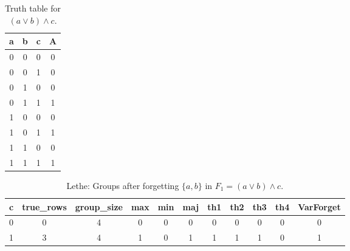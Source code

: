 \begin{table}[!tb]
    \centering
    \begin{tabular}{|c|c|c|c|}
        \hline
        \textbf{a} & \textbf{b} & \textbf{c} & \textbf{A} \\ \hline
        0 & 0 & 0 & 0 \\ \hline
        0 & 0 & 1 & 0 \\ \hline
        0 & 1 & 0 & 0 \\ \hline
        0 & 1 & 1 & 1 \\ \hline
        1 & 0 & 0 & 0 \\ \hline
        1 & 0 & 1 & 1 \\ \hline
        1 & 1 & 0 & 0 \\ \hline
        1 & 1 & 1 & 1 \\ \hline
    \end{tabular}
    \caption{Truth table for $(a \lor b) \land c$.}
    \label{tab:truthtab}
\end{table}

\begin{table}[!tb]
    \centering
    \begin{tabular}{|c|c|c|c|c|c|c|c|c|c|c|}
        \hline
        \textbf{c} & \textbf{true\_rows} & \textbf{group\_size} & \textbf{max} & \textbf{min} & \textbf{maj} & \textbf{th1} & \textbf{th2} & \textbf{th3} & \textbf{th4} & \textbf{VarForget} \\ \hline
        \rowcolor{gray!40} 0 & 0 & 4 & 0 & 0 & 0 & 0 & 0 & 0 & 0 & 0 \\ \hline
        \rowcolor{blue!40} 1 & 3 & 4 & 1 & 0 & 1 & 1 & 1 & 1 & 0 & 1 \\ \hline
    \end{tabular}
    \caption{Lethe: Groups after forgetting $\{a, b\}$ in $F_{1} = (a \lor b) \land c$.}
    \label{tab:lethe-F1-ab-groups}
\end{table}
